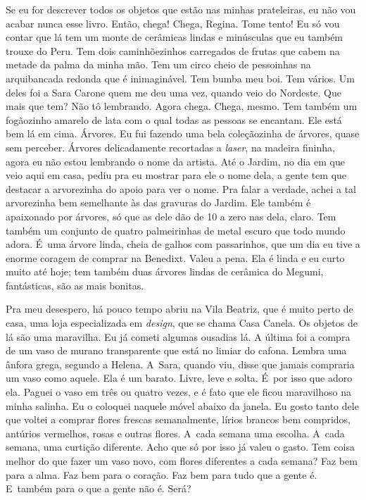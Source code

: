 Se eu for descrever todos os objetos que estão nas minhas prateleiras,
eu não vou acabar nunca esse livro. Então, chega! Chega, Regina. Tome
tento! Eu só vou contar que lá tem um monte de cerâmicas lindas e
minúsculas que eu também trouxe do Peru. Tem dois caminhõezinhos
carregados de frutas que cabem na metade da palma da minha mão. Tem um
circo cheio de pessoinhas na arquibancada redonda que é inimaginável.
Tem bumba meu boi. Tem vários. Um deles foi a Sara Carone quem me deu
uma vez, quando veio do Nordeste. Que mais que tem? Não tô lembrando.
Agora chega. Chega, mesmo. Tem também um fogãozinho amarelo de lata com
o qual todas as pessoas se encantam. Ele está bem lá em cima. Árvores.
Eu fui fazendo uma bela coleçãozinha de árvores, quase sem perceber.
Árvores delicadamente recortadas a \emph{laser}, na madeira fininha,
agora eu não estou lembrando o nome da artista. Até o Jardim, no dia em
que veio aqui em casa, pediu pra eu mostrar para ele o nome dela, a gente
tem que destacar a arvorezinha do apoio para ver o nome. Pra falar a
verdade, achei a tal arvorezinha bem semelhante às das gravuras do
Jardim. Ele também é apaixonado por árvores, só que as dele dão de 10 a
zero nas dela, claro. Tem também um conjunto de quatro palmeirinhas de
metal escuro que todo mundo adora. É~uma árvore linda, cheia de galhos
com passarinhos, que um dia eu tive a enorme coragem de comprar na
Benedixt. Valeu a pena. Ela é linda e eu curto muito até hoje; tem
também duas árvores lindas de cerâmica do Megumi, fantásticas, são as
mais bonitas.

Pra meu desespero, há pouco tempo abriu na Vila Beatriz, que é muito
perto de casa, uma loja especializada em \emph{design}, que se chama
Casa Canela. Os objetos de lá são uma maravilha. Eu já cometi algumas
ousadias lá. A última foi a compra de um vaso de murano transparente que
está no limiar do cafona. Lembra uma ânfora grega, segundo a Helena. A~Sara, quando viu, disse que jamais compraria um vaso como aquele. Ela é
um barato. Livre, leve e solta. É~por isso que adoro ela. Paguei o vaso
em três ou quatro vezes, e é fato que ele ficou maravilhoso na minha
salinha. Eu o coloquei naquele móvel abaixo da janela. Eu gosto tanto
dele que voltei a comprar flores frescas semanalmente, lírios brancos
bem compridos, antúrios vermelhos, rosas e outras flores. A~cada semana
uma escolha. A~cada semana, uma curtição diferente. Acho que só por isso
já valeu o gasto. Tem coisa melhor do que fazer um vaso novo, com flores
diferentes a cada semana? Faz bem para a alma. Faz bem para o coração.
Faz bem para tudo que a gente é. E~também para o que a gente não é.
Será?

